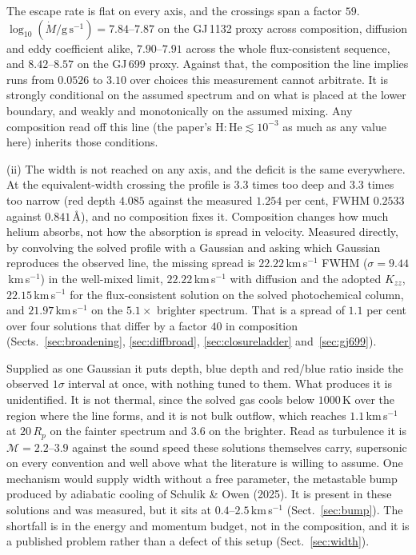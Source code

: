 \documentclass[english,a4paper]{my_memo}
\begin{document}
The escape rate is flat on every axis, and the crossings span a factor $59$.
$\log_{10}(\dot M/\mathrm{g\,s^{-1}}) = 7.84$--$7.87$ on the GJ\,1132 proxy
across composition, diffusion and eddy coefficient alike, $7.90$--$7.91$
across the whole flux-consistent sequence, and $8.42$--$8.57$ on the GJ\,699
proxy. Against that, the composition the line implies runs from $0.0526$ to
$3.10$ over choices this measurement cannot arbitrate. It is strongly
conditional on the assumed spectrum and on what is placed at the lower
boundary, and weakly and monotonically on the assumed mixing. Any composition
read off this line (the paper's $\mathrm{H\!:\!He} \lesssim 10^{-3}$ as much
as any value here) inherits those conditions.

\medskip
\noindent (ii) The width is not reached on any axis, and the deficit is the
same everywhere. At the equivalent-width crossing the profile is $3.3$ times
too deep and $3.3$ times too narrow (red depth $4.085$ against the measured
$1.254$ per cent, FWHM $0.2533$ against $0.841$\,\AA), and no composition
fixes it. Composition changes how much helium absorbs, not how the absorption
is spread in velocity. Measured directly, by convolving the solved profile
with a Gaussian and asking which Gaussian reproduces the observed line, the
missing spread is $22.22$\,km\,s$^{-1}$ FWHM
($\sigma = 9.44$\,km\,s$^{-1}$) in the well-mixed limit,
$22.22$\,km\,s$^{-1}$ with diffusion and the adopted $K_{zz}$,
$22.15$\,km\,s$^{-1}$ for the flux-consistent solution on the solved
photochemical column, and $21.97$\,km\,s$^{-1}$ on the $5.1\times$ brighter
spectrum. That is a spread of $1.1$ per cent over four solutions that differ
by a factor $40$ in composition (Sects.~\ref{sec:broadening},
\ref{sec:diffbroad}, \ref{sec:closureladder} and~\ref{sec:gj699}).

Supplied as one Gaussian it puts depth, blue depth and red/blue ratio inside
the observed $1\sigma$ interval at once, with nothing tuned to them. What
produces it is unidentified. It is not thermal, since the solved gas cools
below $1000$\,K over the region where the line forms, and it is not bulk
outflow, which reaches $1.1$\,km\,s$^{-1}$ at $20\,R_p$ on the fainter
spectrum and $3.6$ on the brighter. Read as turbulence it is
$\mathcal{M} = 2.2$--$3.9$ against the sound speed these solutions themselves
carry, supersonic on every convention and well above what the literature is
willing to assume. One mechanism would supply width without a free parameter,
the metastable bump produced by adiabatic cooling of Schulik \& Owen (2025).
It is present in these solutions and was measured, but it sits at
$0.4$--$2.5$\,km\,s$^{-1}$ (Sect.~\ref{sec:bump}). The shortfall is in the
energy and momentum budget, not in the composition, and it is a published
problem rather than a defect of this setup (Sect.~\ref{sec:width}).
\end{document}

